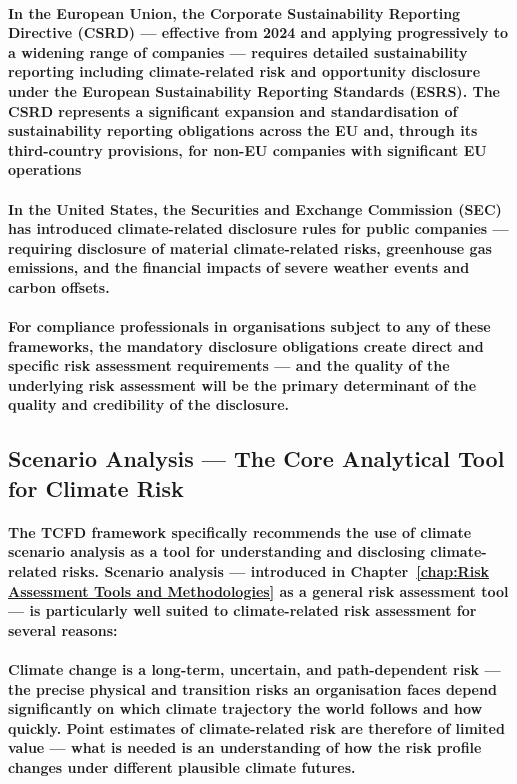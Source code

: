 \paragraph{In the \textbf{European Union}, the \textbf{Corporate Sustainability Reporting Directive (CSRD)} — effective from 2024 and applying progressively to a widening range of companies — requires detailed sustainability reporting including climate-related risk and opportunity disclosure under the \textbf{European Sustainability Reporting Standards (ESRS)}. The CSRD represents a significant expansion and standardisation of sustainability reporting obligations across the EU and, through its third-country provisions, for non-EU companies with significant EU operations}
\paragraph{In the \textbf{United States}, the \textbf{Securities and Exchange Commission (SEC)} has introduced climate-related disclosure rules for public companies — requiring disclosure of material climate-related risks, greenhouse gas emissions, and the financial impacts of severe weather events and carbon offsets.}
\paragraph{For compliance professionals in organisations subject to any of these frameworks, the mandatory disclosure obligations create direct and specific risk assessment requirements — and the quality of the underlying risk assessment will be the primary determinant of the quality and credibility of the disclosure.}

\subsection{Scenario Analysis — The Core Analytical Tool for Climate Risk}
\paragraph{The TCFD framework specifically recommends the use of climate scenario analysis as a tool for understanding and disclosing climate-related risks. Scenario analysis — introduced in Chapter~\ref{chap:Risk Assessment Tools and Methodologies} as a general risk assessment tool — is particularly well suited to climate-related risk assessment for several reasons:}
\paragraph{Climate change is a long-term, uncertain, and path-dependent risk — the precise physical and transition risks an organisation faces depend significantly on which climate trajectory the world follows and how quickly. Point estimates of climate-related risk are therefore of limited value — what is needed is an understanding of how the risk profile changes under different plausible climate futures.}
